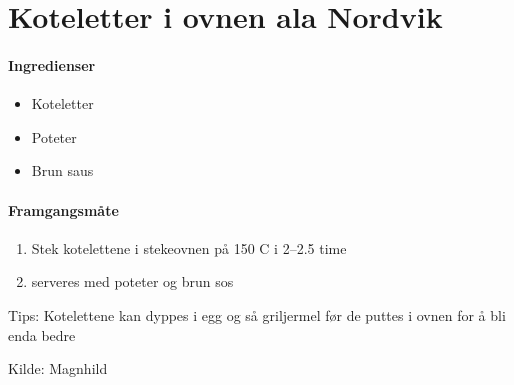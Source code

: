 \section{﻿Koteletter i ovnen ala Nordvik}


\paragraph{Ingredienser}
\begin{itemize}[noitemsep]
	\item Koteletter
	\item Poteter
	\item Brun saus
\end{itemize}

\paragraph{Framgangsmåte}
\begin{enumerate}[noitemsep]
	\item Stek kotelettene i stekeovnen på 150 \degree C i 2--2.5 time
	\item serveres med poteter og brun sos
\end{enumerate}

Tips: Kotelettene kan dyppes i egg og så griljermel før de puttes i ovnen for å bli enda bedre

Kilde: Magnhild
